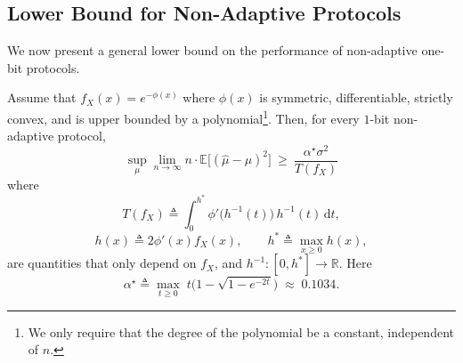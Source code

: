 \documentclass[10pt]{article} %
\theoremstyle{plain}
\theoremstyle{definition}
\theoremstyle{remark}
\newcommand{\bE}{\mathbb E}
\newcommand{\bR}{\mathbb R}
\newcommand{\dx}{\mathrm{d}}
\begin{document}
\subsection{Lower Bound for Non-Adaptive Protocols}
We now present a general lower bound on the performance of non-adaptive one-bit protocols.



\begin{theorem}\label{thm:lowerbound_nonadaptive}
Assume that $f_{X}(x)=e^{-\phi(x)}$ where $\phi(x)$ is symmetric, differentiable, strictly convex, and is upper bounded by a polynomial\footnote{We only require that the degree of the polynomial be a constant, independent of $n$.}. Then, for every $1$-bit non-adaptive protocol,
\begin{equation}\label{eq:final-optimized-mse}
 \sup_{\mu}\lim_{n\to\infty} 
 n \cdot\bE\bigl[(\hat\mu-\mu)^2\bigr]
\ \ge\ \frac{\alpha^\star\sigma^2}{T(f_X)}
\end{equation}
where
\[
T(f_X) \triangleq \int_{0}^{h^*} \phi' \bigl(h^{-1}(t)\bigr)\, h^{-1}(t)\, \dx t ,
\]
\[
h(x) \triangleq 2\phi'(x)f_X(x), \qquad h^*\triangleq \max_{x\geq 0}h(x),
\]
 are quantities that only depend on $f_X$, and $h^{-1}:[0,h^*]\to\bR$. Here
\[
\alpha^\star \triangleq \max_{t\ge 0} \; t\Big(1-\sqrt{1-e^{-2t}}\Big)\;\approx\;0.1034.
\]
\end{theorem}
\end{document}
